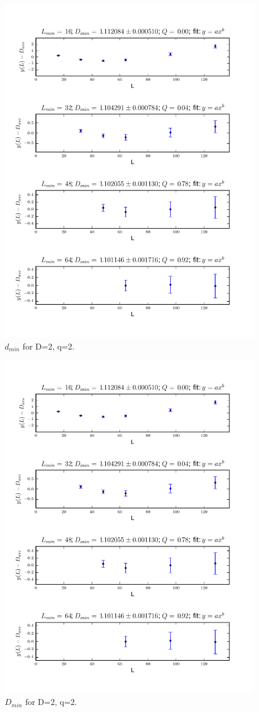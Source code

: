 \documentclass[pre,preprint]{revtex4}
\begin{document}

\begin{figure}[htp]
\centering
\includegraphics[width=.85\textwidth]{figures/d_min_D2q2_46_fig}
\caption{$d_{min}$ for D=2, q=2.}\label{fig:3}
\end{figure}


\begin{figure}[htp]
\centering
\includegraphics[width=.85\textwidth]{figures/D_min_D2q2_46_fig}
\caption{$D_{min}$ for D=2, q=2.}\label{fig:4}
\end{figure}
\end{document}
